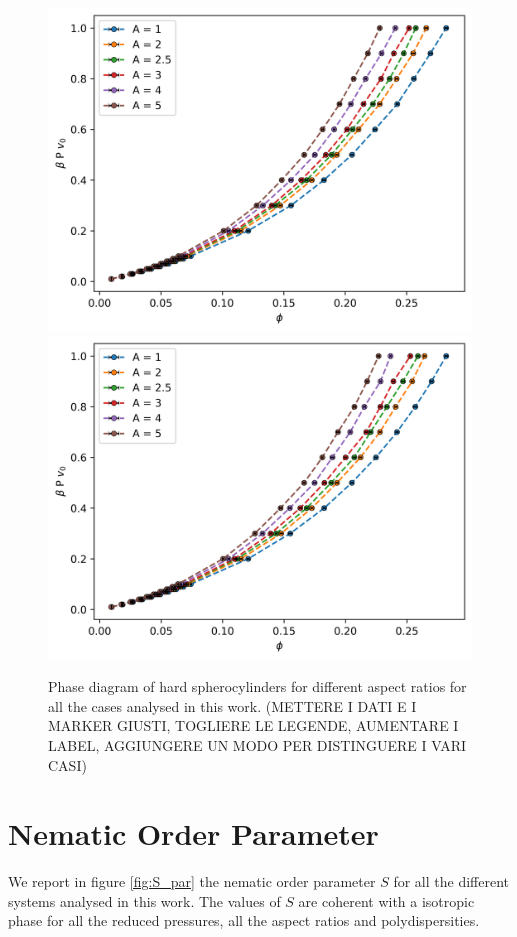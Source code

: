 \documentclass[journal=jacsat,manuscript=article]{achemso}
\begin{document}
\begin{figure}[!h]
    \includegraphics[width=0.3 \columnwidth]{Figures/EOS/PolyDGauss0.75.png}
    \includegraphics[width=0.3 \columnwidth]{Figures/EOS/PolyDLGauss0.75.png}
    \caption{Phase diagram of hard spherocylinders for different aspect ratios for all the cases analysed in this work. (METTERE I DATI E I MARKER GIUSTI, TOGLIERE LE LEGENDE, AUMENTARE I LABEL, AGGIUNGERE UN MODO PER DISTINGUERE I VARI CASI)}
    \label{fig:EOS_tot}
\end{figure}

\section{Nematic Order Parameter}
 We report in figure \ref{fig:S_par} the nematic order parameter $S$ for all the different systems analysed in this work. The values of $S$ are coherent with a isotropic phase for all the reduced pressures, all the aspect ratios and polydispersities.
\end{document}
